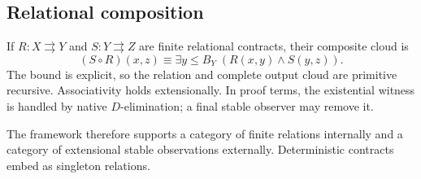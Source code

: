 \subsection{Relational composition}

If \(R:X\rightrightarrows Y\) and \(S:Y\rightrightarrows Z\) are finite
relational contracts, their composite cloud is
\[
   (S\circ R)(x,z)\equiv
      \exists y\le B_Y\;(R(x,y)\wedge S(y,z)).
\]
The bound is explicit, so the relation and complete output cloud are primitive
recursive.  Associativity holds extensionally.  In proof terms, the existential
witness is handled by native \(D\)-elimination; a final stable observer may
remove it.

The framework therefore supports a category of finite relations internally and
a category of extensional stable observations externally.  Deterministic
contracts embed as singleton relations.
